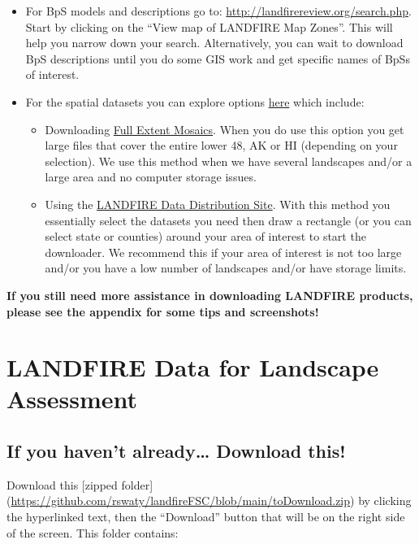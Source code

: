 \documentclass[
]{book}
\providecommand{\tightlist}{%
  \setlength{\itemsep}{0pt}\setlength{\parskip}{0pt}}
\begin{document}
\begin{itemize}
\tightlist
\item
  For BpS models and descriptions go to: \url{http://landfirereview.org/search.php}. Start by clicking on the ``View map of LANDFIRE Map Zones''. This will help you narrow down your search. Alternatively, you can wait to download BpS descriptions until you do some GIS work and get specific names of BpSs of interest.
\item
  For the spatial datasets you can explore options \href{https://www.landfire.gov/getdata.php}{here} which include:

  \begin{itemize}
  \tightlist
  \item
    Downloading \href{https://www.landfire.gov/version_comparison.php}{Full Extent Mosaics}. When you do use this option you get large files that cover the entire lower 48, AK or HI (depending on your selection). We use this method when we have several landscapes and/or a large area and no computer storage issues.
  \item
    Using the \href{https://www.landfire.gov/viewer/}{LANDFIRE Data Distribution Site}. With this method you essentially select the datasets you need then draw a rectangle (or you can select state or counties) around your area of interest to start the downloader. We recommend this if your area of interest is not too large and/or you have a low number of landscapes and/or have storage limits.
  \end{itemize}
\end{itemize}

\textbf{If you still need more assistance in downloading LANDFIRE products, please see the appendix for some tips and screenshots!}

\hypertarget{gis}{%
\chapter{LANDFIRE Data for Landscape Assessment}\label{gis}}

\hypertarget{if-you-havent-already-download-this}{%
\section{If you haven't already\ldots{} Download this!}\label{if-you-havent-already-download-this}}

Download this {[}zipped folder{]} (\url{https://github.com/rswaty/landfireFSC/blob/main/toDownload.zip}) by clicking the hyperlinked text, then the ``Download'' button that will be on the right side of the screen. This folder contains:
\end{document}
